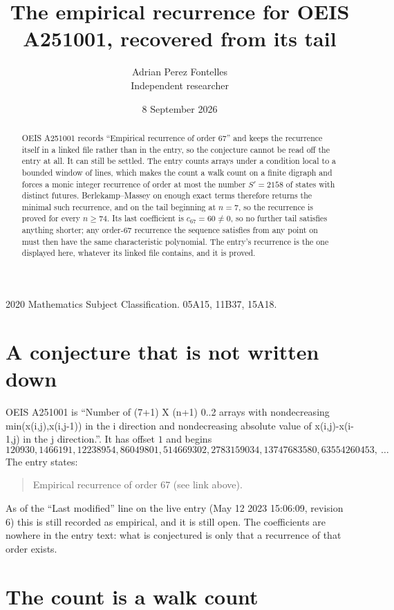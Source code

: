 \documentclass[11pt,a4paper]{article}
\title{The empirical recurrence for OEIS A251001, recovered from its tail}
\author{Adrian Perez Fontelles\\ \small Independent researcher}
\date{8 September 2026}
\theoremstyle{plain}
\theoremstyle{definition}
\begin{document}
\maketitle

\begin{abstract}
OEIS A251001 records ``Empirical recurrence of order $67$'' and keeps the recurrence itself in
a linked file rather than in the entry, so the conjecture cannot be read off the entry at all.
It can still be settled. The entry counts arrays under a condition local to a bounded window of
lines, which makes the count a walk count on a finite digraph and forces a monic integer
recurrence of order at most the number $S'=2158$ of states with distinct futures. Berlekamp--Massey on
enough exact terms therefore returns the minimal such recurrence, and on the tail beginning at $n=7$, so the recurrence is proved for every $n\ge74$.
Its last coefficient is $c_{67}=60\neq0$, so no further tail satisfies anything
shorter; any order-$67$ recurrence the sequence satisfies from any point on must then have
the same characteristic polynomial. The entry's recurrence is the one displayed here, whatever
its linked file contains, and it is proved.
\end{abstract}

\noindent\small 2020 Mathematics Subject Classification. 05A15, 11B37, 15A18.\normalsize

\section{A conjecture that is not written down}

OEIS A251001 is ``Number of (7+1) X (n+1) 0..2 arrays with nondecreasing min(x(i,j),x(i,j-1)) in the i direction and nondecreasing absolute value of x(i,j)-x(i-1,j) in the j direction.''. It has offset $1$ and begins
\[
120930, 1466191, 12238954, 86049801, 514669302, 2783159034, 13747683580, 63554260453,\ \dots
\]
The entry states:
\begin{quote}
Empirical recurrence of order 67 (see link above).
\end{quote}
As of the ``Last modified'' line on the live entry (May 12 2023 15:06:09, revision 6)
this is still recorded as empirical, and it is still open. The coefficients are nowhere in the
entry text: what is conjectured is only that a recurrence of that order exists.

\section{The count is a walk count}
\end{document}
